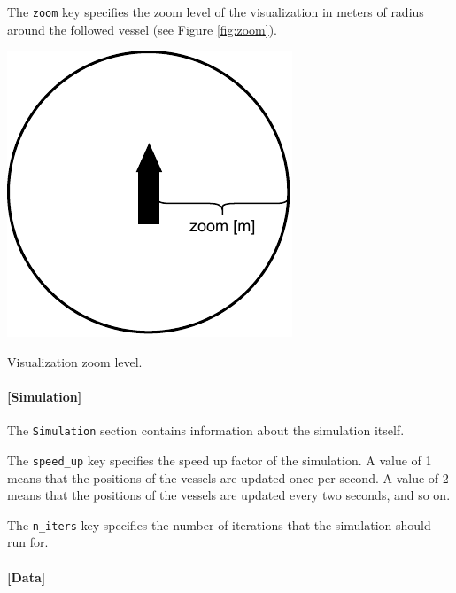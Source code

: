 \documentclass[
	a4paper, %
	12pt, %
]{persist}
\begin{document}
The \verb|zoom| key specifies the zoom level of the visualization in meters of radius around the followed vessel (see Figure \ref{fig:zoom}).
\begin{marginfigure}
	\includegraphics[width=\linewidth]{img/zoom.pdf}
	\caption{Visualization zoom level.}
	\label{fig:zoom}
\end{marginfigure}


\paragraph{[Simulation]}

The \verb|Simulation| section contains information about the simulation itself.

The \verb|speed_up| key specifies the speed up factor of the simulation. A value of 1 means that the positions of the vessels are updated once per second. A value of 2 means that the positions of the vessels are updated every two seconds, and so on.

The \verb|n_iters| key specifies the number of iterations that the simulation should run for.

\paragraph{[Data]}
\end{document}
